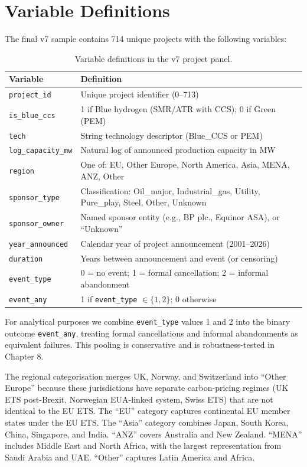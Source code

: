 \documentclass[11pt,a4paper]{article}
\begin{document}
\section{Variable Definitions}
\label{sec:ch4-variables}

The final v7 sample contains 714 unique projects with the following variables:

\begin{table}[h!]
\centering
\caption{Variable definitions in the v7 project panel.}
\begin{tabular}{lp{10.5cm}}
\toprule
Variable & Definition \\
\midrule
\texttt{project\_id} & Unique project identifier (0--713) \\
\texttt{is\_blue\_ccs} & 1 if Blue hydrogen (SMR/ATR with CCS); 0 if Green (PEM) \\
\texttt{tech} & String technology descriptor (Blue\_CCS or PEM) \\
\texttt{log\_capacity\_mw} & Natural log of announced production capacity in MW \\
\texttt{region} & One of: EU, Other Europe, North America, Asia, MENA, ANZ, Other \\
\texttt{sponsor\_type} & Classification: Oil\_major, Industrial\_gas, Utility, Pure\_play, Steel, Other, Unknown \\
\texttt{sponsor\_owner} & Named sponsor entity (e.g., BP plc., Equinor ASA), or ``Unknown'' \\
\texttt{year\_announced} & Calendar year of project announcement (2001--2026) \\
\texttt{duration} & Years between announcement and event (or censoring) \\
\texttt{event\_type} & 0 = no event; 1 = formal cancellation; 2 = informal abandonment \\
\texttt{event\_any} & 1 if \texttt{event\_type} $\in \{1, 2\}$; 0 otherwise \\
\bottomrule
\end{tabular}
\label{tab:ch4-variables}
\end{table}

For analytical purposes we combine \texttt{event\_type} values 1 and 2 into the binary outcome \texttt{event\_any}, treating formal cancellations and informal abandonments as equivalent failures. This pooling is conservative and is robustness-tested in Chapter 8.

The regional categorisation merges UK, Norway, and Switzerland into ``Other Europe'' because these jurisdictions have separate carbon-pricing regimes (UK ETS post-Brexit, Norwegian EUA-linked system, Swiss ETS) that are not identical to the EU ETS. The ``EU'' category captures continental EU member states under the EU ETS. The ``Asia'' category combines Japan, South Korea, China, Singapore, and India. ``ANZ'' covers Australia and New Zealand. ``MENA'' includes Middle East and North Africa, with the largest representation from Saudi Arabia and UAE. ``Other'' captures Latin America and Africa.
\end{document}
